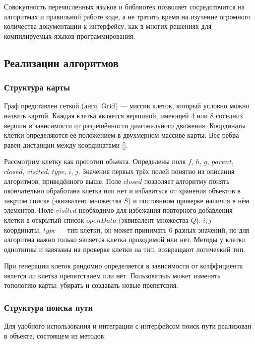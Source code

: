 Совокупность перечисленных языков и библиотек позволяет сосредоточится на алгоритмах и правильной работе коде, а не тратить время на изучение огромного количества документации к интерфейсу, как в многих решениях для компилируемых языков программирования.
\subsection{Реализации алгоритмов}
\subsubsection{Структура карты}
Граф представлен сеткой (англ. Grid) — массив клеток, который условно можно назвать картой. Каждая клетка является вершиной, имеющей 4 или 8 соседних вершин в зависимости от разрешённости диагонального движения. Координаты клетки определяются её положением в двухмерном массиве карты. Вес ребра равен дистанции между координатами [].

Рассмотрим клетку как прототип объекта. Определены поля $f$, $h$, $g$, $parent$, $closed$, $visited$, $type$, $i$, $j$. Значения первых трёх полей понятно из описания алгоритмов, приведённого выше. Поле $closed$ позволяет алгоритму понять окончательно обработана клетка или нет и избавиться от хранения объектов в закртом списке (эквивалент множества $S$) и постоянном проверке наличия в нём элементов. Поле $visited$ необходимо для избежания повторного добавления клетки в открытый список $openData$ (эквивалент множества $Q$). $i,j$ — координаты. $type$ — тип клетки, он может принимать 6 разных значений, но для алгоритма важно только является клетка проходимой или нет. Методы у клетки однотипны и завязаны на проверке клетки на тип, возвращают логический тип. 

При генерации клеток рандомно определяется в зависимости от коэффициента явлется ли клетка препятствием или нет. Пользователь может изменять топологию карты: убирать и создавать новые препятсвия.

\subsubsection{Структура поиска пути}
Для удобного использования и интеграции с интерфейсом поиск пути реализован в объекте, состоящем из методов:


